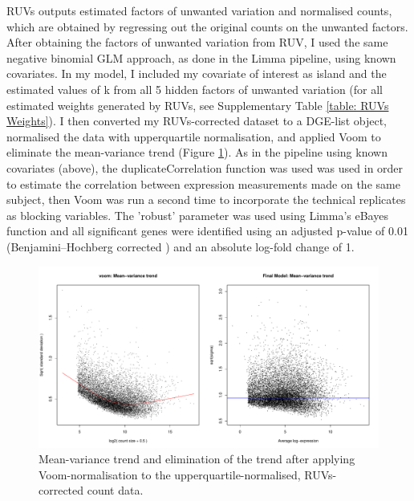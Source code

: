 \documentclass[12pt,a4paper,titlepage,twoside,openright]{book}
\begin{document}
\begin{mainmatter}
{{RUVs outputs estimated factors of unwanted variation and normalised counts, which are obtained by regressing out the original counts on the unwanted factors. After obtaining the factors of unwanted variation from RUV, I used the same negative binomial GLM approach, as done in the Limma pipeline, using known covariates. In my model, I included my covariate of interest as island and the estimated values of k from all 5 hidden factors of unwanted variation (for all estimated weights generated by RUVs, see Supplementary Table \ref{table: RUVs Weights}). I then converted my RUVs-corrected dataset to a DGE-list object, normalised the data with upperquartile normalisation, and applied Voom to eliminate the mean-variance trend (﻿Figure \ref{fig:Voom normalisation RUV}). As in the pipeline using known covariates (above), the duplicateCorrelation function was used was used in order to estimate the correlation between expression measurements made on the same subject, then Voom was run a second time to incorporate the technical replicates as blocking variables. The 'robust' parameter was used using Limma's eBayes function and all significant genes were identified using an adjusted p-value of 0.01 (Benjamini–Hochberg corrected \cite{benjamini1995controlling}) and an absolute log-fold change of 1. 

\begin{figure}[htb!]
\centering
\includegraphics[width=\textwidth,height=\textheight,keepaspectratio]{Figures/Limma_voom_upperquartilenormalisation.pdf}
\caption{Mean-variance trend and elimination of the trend after applying Voom-normalisation to the upperquartile-normalised, RUVs-corrected count data.}
\label{fig:Voom normalisation RUV}
\end{figure}


}}
\end{mainmatter}
\end{document}
